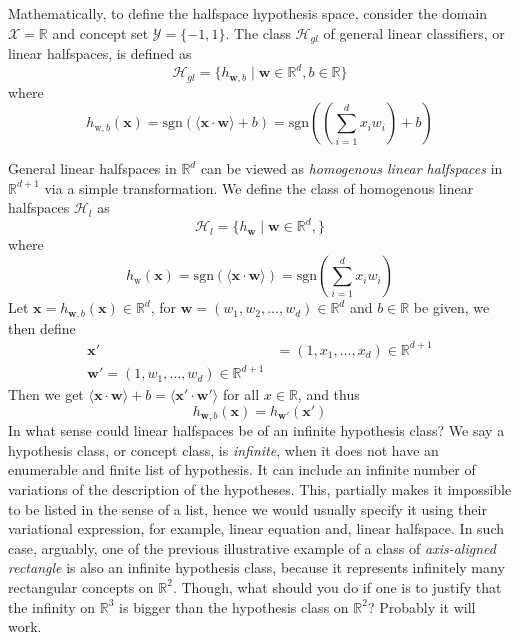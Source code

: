 Mathematically, to define the halfspace hypothesis space, consider the domain $\mathcal{X}=\mathbb{R}$ and concept set $\mathcal{Y}=\{-1,1\}$. The class $\mathcal{H}_{gl}$ of general linear classifiers, or linear halfspaces, is defined as 
\begin{equation}
    \mathcal{H}_{gl} = \{ h_{\bm{w},b} \mid \bm{w}\in \mathbb{R}^{d}, b\in \mathbb{R}\}
\end{equation}
where 
\begin{equation}
    h_{\mbox{w},b}(\bm{x}) = \mathrm{sgn}(\langle \bm{x}\cdot \bm{w}\rangle + b) = \mathrm{sgn}\left(\left( \sum^{d}_{i=1} x_{i} w_{i}  \right) +b\right)
\end{equation}

General linear halfspaces in $\mathbb{R}^{d}$ can be viewed as \textit{homogenous linear halfspaces} in $\mathbb{R}^{d+1}$ via a simple transformation. We define the class of homogenous linear halfspaces $\mathcal{H}_{l}$ as 
\begin{equation*}
    \mathcal{H}_{l} = \{ h_{\bm{w}} \mid \bm{w}\in \mathbb{R}^{d}, \}
\end{equation*}
where 
\begin{equation}
    h_{\mbox{w}}(\bm{x}) = \mathrm{sgn}(\langle \bm{x}\cdot \bm{w}\rangle) = \mathrm{sgn}\left( \sum^{d}_{i=1} x_{i} w_{i} \right)
\end{equation}
Let $\bm{x}=h_{\bm{w},b}(\bm{x})\in \mathbb{R}^{d}$, for $\bm{w}=(w_1, w_2,\dots,w_{d})\in \mathbb{R}^{d}$ and $b\in \mathbb{R}$ be given, we then define 
\begin{align}
    \bm{x}' &= (1,x_1,\dots,x_{d}) \in \mathbb{R}^{d+1}\\
    \bm{w}' = (1,w_1,\dots,w_d) \in \mathbb{R}^{d+1}
\end{align}
Then we get $\langle \bm{x}\cdot \bm{w}\rangle + b = \langle \bm{x}'\cdot \bm{w}'\rangle$ for all $x\in \mathbb{R}$, and thus 
\begin{equation*}
    h_{\bm{w},b}(\bm{x}) = h_{\bm{w}'}(\bm{x}')
\end{equation*}
In what sense could linear halfspaces be of an infinite hypothesis class? We say a hypothesis class, or concept class, is \textit{infinite}, when it does not have an enumerable and finite list of hypothesis. It can include an infinite number of variations of the description of the hypotheses. This, partially makes it impossible to be listed in the sense of a list, hence we would usually specify it using their variational expression, for example, linear equation and, linear halfspace. In such case, arguably, one of the previous illustrative example of a class of \textit{axis-aligned rectangle} is also an infinite hypothesis class, because it represents infinitely many rectangular concepts on $\mathbb{R}^{2}$. Though, what should you do if one is to justify that the infinity on $\mathbb{R}^{3}$ is bigger than the hypothesis class on $\mathbb{R}^{2}$? Probably it will work. 
